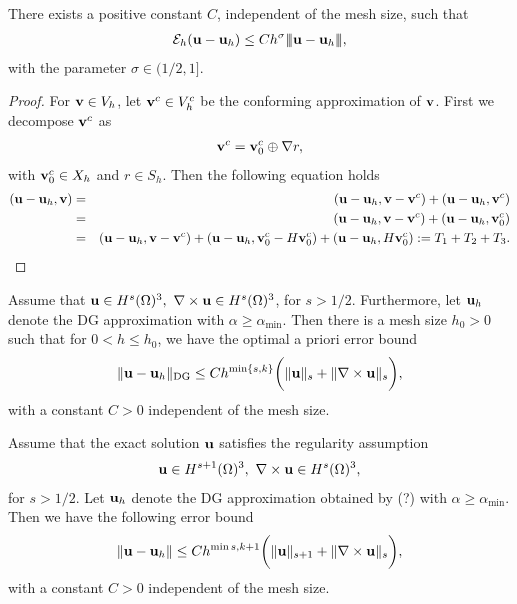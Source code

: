 \documentclass[final,leqno]{siamltex704}
\newcommand{\bv}{{\bf v}}
\def\bu{{\bf u}}
\def\bv{{\bf v}}
\def\3bar{{|\hspace{-.02in}|\hspace{-.02in}|}}
\begin{document}
\begin{lemma}
There exists a positive constant $C$, independent of the mesh size, such that
\begin{eqnarray}
\mathcal{E}_h(\bu-\bu_h)\le Ch^{\sigma}\3bar\bu-\bu_h\3bar,
\end{eqnarray}
with the parameter $\sigma\in (1/2,1]$.
\end{lemma}
\begin{proof}
For $\bv\in V_h$, let $\bv^c\in V_h^c$ be the conforming approximation of $\bv$. First we decompose $\bv^c$ as
\begin{eqnarray}
\bv^c=\bv_0^c\oplus\nabla r,
\end{eqnarray}
with $\bv_0^c\in X_h$ and $r\in S_h$. Then the following equation holds
\begin{eqnarray*}
(\bu-\bu_h,\bv)
%
&=&(\bu-\bu_h,\bv-\bv^c)+(\bu-\bu_h,\bv^c)\\
%
&=&(\bu-\bu_h,\bv-\bv^c)+(\bu-\bu_h,\bv^c_0)\\
%
&=&(\bu-\bu_h,\bv-\bv^c)+(\bu-\bu_h,\bv^c_0-H\bv_0^c)+(\bu-\bu_h,H\bv^c_0)
:=T_1+T_2+T_3.
\end{eqnarray*}
\end{proof}

\begin{theorem}
Assume that $\bu\in H^s(\Omega)^3,\ \nabla\times\bu\in H^s(\Omega)^3$, for $s>1/2$. Furthermore, let $\bu_h$ denote the DG approximation with $\alpha\ge \alpha_{\min}.$ Then there is a mesh size $h_0>0$ such that for $0<h\le h_0$, we have the optimal a priori error bound
\begin{eqnarray}
\|\bu-\bu_h\|_{\text{DG}}\le Ch^{\min\{s,k\}}\bigg(\|\bu\|_s+\|\nabla\times\bu\|_s\bigg),
\end{eqnarray}
with a constant $C>0$ independent of the mesh size.
\end{theorem}

\begin{theorem}
Assume that the exact solution $\bu$ satisfies the regularity assumption
\begin{eqnarray}
\bu\in H^{s+1}(\Omega)^3,\ \nabla\times\bu\in H^s(\Omega)^3,
\end{eqnarray}
for $s>1/2$. Let $\bu_h$ denote the DG approximation obtained by (?) with $\alpha\ge\alpha_{\min}$. Then we have the following error bound
\begin{eqnarray}
\|\bu-\bu_h\|\le Ch^{\min{s,k}+1}\bigg(\|\bu\|_{s+1}+\|\nabla\times\bu\|_s\bigg),
\end{eqnarray}
with a constant $C>0$ independent of the mesh size.
\end{theorem}
\end{document}
